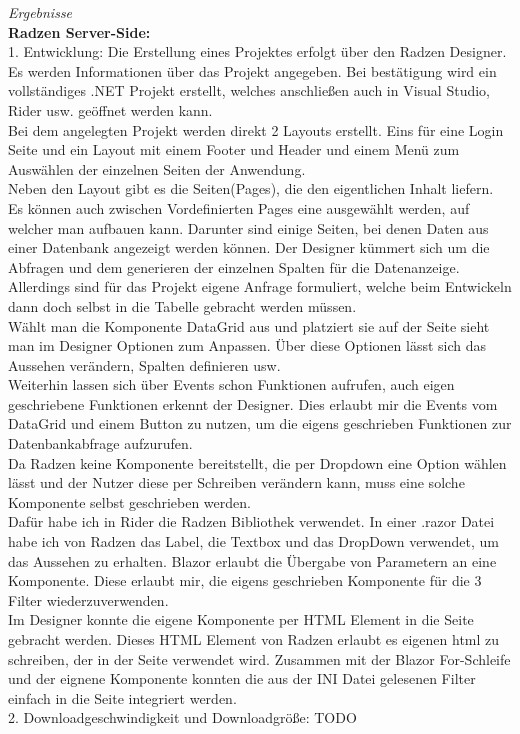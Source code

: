 \documentclass[ngerman]{article}
\begin{document}
    \textit{Ergebnisse}\\
    \textbf{Radzen Server-Side:}\\
    1. Entwicklung: Die Erstellung eines Projektes erfolgt über den Radzen Designer. Es werden Informationen über das Projekt angegeben. Bei bestätigung wird ein vollständiges .NET Projekt erstellt, welches anschließen auch in Visual Studio, Rider usw. geöffnet werden kann.\\
    Bei dem angelegten Projekt werden direkt 2 Layouts erstellt. Eins für eine Login Seite und ein Layout mit einem Footer und Header und einem Menü zum Auswählen der einzelnen Seiten der Anwendung.\\
    Neben den Layout gibt es die Seiten(Pages), die den eigentlichen Inhalt liefern. Es können auch zwischen Vordefinierten Pages eine ausgewählt werden, auf welcher man aufbauen kann. Darunter sind einige Seiten, bei denen Daten aus einer Datenbank angezeigt werden können. Der Designer kümmert sich um die Abfragen und dem generieren der einzelnen Spalten für die Datenanzeige.\\
    Allerdings sind für das Projekt eigene Anfrage formuliert, welche beim Entwickeln dann doch selbst in die Tabelle gebracht werden müssen.\\
    Wählt man die Komponente DataGrid aus und platziert sie auf der Seite sieht man im Designer Optionen zum Anpassen. Über diese Optionen lässt sich das Aussehen verändern, Spalten definieren usw.\\
    Weiterhin lassen sich über Events schon Funktionen aufrufen, auch eigen geschriebene Funktionen erkennt der Designer. Dies erlaubt mir die Events vom DataGrid und einem Button zu nutzen, um die eigens geschrieben Funktionen zur Datenbankabfrage aufzurufen.\\
    Da Radzen keine Komponente bereitstellt, die per Dropdown eine Option wählen lässt und der Nutzer diese per Schreiben verändern kann, muss eine solche Komponente selbst geschrieben werden.\\
    Dafür habe ich in Rider die Radzen Bibliothek verwendet. In einer .razor Datei habe ich von Radzen das Label, die Textbox und das DropDown verwendet, um das Aussehen zu erhalten. Blazor erlaubt die Übergabe von Parametern an eine Komponente. Diese erlaubt mir, die eigens geschrieben Komponente für die 3 Filter wiederzuverwenden.\\
    Im Designer konnte die eigene Komponente per HTML Element in die Seite gebracht werden. Dieses HTML Element von Radzen erlaubt es eigenen html zu schreiben, der in der Seite verwendet wird. Zusammen mit der Blazor For-Schleife und der eignene Komponente konnten die aus der INI Datei gelesenen Filter einfach in die Seite integriert werden.\\
    2. Downloadgeschwindigkeit und Downloadgröße: TODO
    \newpage\noindent
\end{document}
